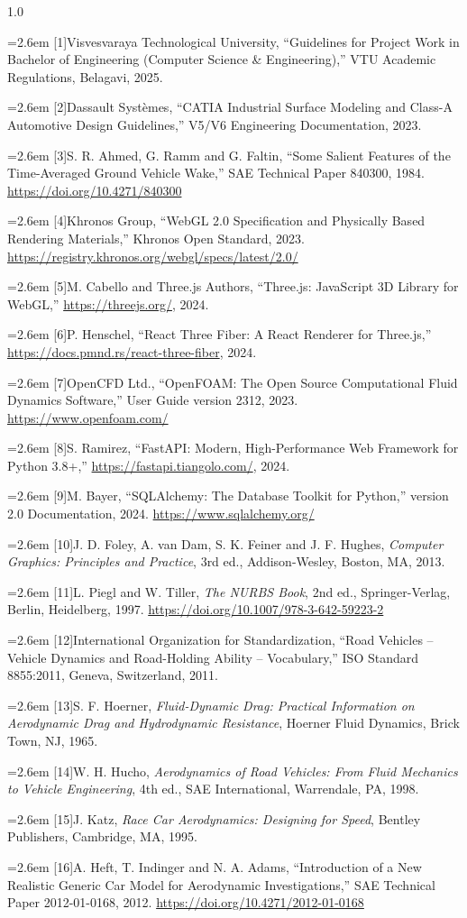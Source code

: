 \documentclass[12pt,a4paper]{report}
\newcommand{\refitem}[2]{\par\noindent\hangindent=2.6em\hangafter=1 [#1]\hspace{0.9em}#2\par\vspace{2pt}}
\begin{document}
\begin{spacing}{1.0}
\small
\refitem{1}{Visvesvaraya Technological University, ``Guidelines for Project Work in Bachelor of Engineering (Computer Science \& Engineering),'' VTU Academic Regulations, Belagavi, 2025.}
\refitem{2}{Dassault Syst{\`e}mes, ``CATIA Industrial Surface Modeling and Class-A Automotive Design Guidelines,'' V5/V6 Engineering Documentation, 2023.}
\refitem{3}{S. R. Ahmed, G. Ramm and G. Faltin, ``Some Salient Features of the Time-Averaged Ground Vehicle Wake,'' SAE Technical Paper 840300, 1984. \url{https://doi.org/10.4271/840300}}
\refitem{4}{Khronos Group, ``WebGL 2.0 Specification and Physically Based Rendering Materials,'' Khronos Open Standard, 2023. \url{https://registry.khronos.org/webgl/specs/latest/2.0/}}
\refitem{5}{M. Cabello and Three.js Authors, ``Three.js: JavaScript 3D Library for WebGL,'' \url{https://threejs.org/}, 2024.}
\refitem{6}{P. Henschel, ``React Three Fiber: A React Renderer for Three.js,'' \url{https://docs.pmnd.rs/react-three-fiber}, 2024.}
\refitem{7}{OpenCFD Ltd., ``OpenFOAM: The Open Source Computational Fluid Dynamics Software,'' User Guide version 2312, 2023. \url{https://www.openfoam.com/}}
\refitem{8}{S. Ramirez, ``FastAPI: Modern, High-Performance Web Framework for Python 3.8+,'' \url{https://fastapi.tiangolo.com/}, 2024.}
\refitem{9}{M. Bayer, ``SQLAlchemy: The Database Toolkit for Python,'' version 2.0 Documentation, 2024. \url{https://www.sqlalchemy.org/}}
\refitem{10}{J. D. Foley, A. van Dam, S. K. Feiner and J. F. Hughes, \textit{Computer Graphics: Principles and Practice}, 3rd ed., Addison-Wesley, Boston, MA, 2013.}
\refitem{11}{L. Piegl and W. Tiller, \textit{The NURBS Book}, 2nd ed., Springer-Verlag, Berlin, Heidelberg, 1997. \url{https://doi.org/10.1007/978-3-642-59223-2}}
\refitem{12}{International Organization for Standardization, ``Road Vehicles -- Vehicle Dynamics and Road-Holding Ability -- Vocabulary,'' ISO Standard 8855:2011, Geneva, Switzerland, 2011.}
\refitem{13}{S. F. Hoerner, \textit{Fluid-Dynamic Drag: Practical Information on Aerodynamic Drag and Hydrodynamic Resistance}, Hoerner Fluid Dynamics, Brick Town, NJ, 1965.}
\refitem{14}{W. H. Hucho, \textit{Aerodynamics of Road Vehicles: From Fluid Mechanics to Vehicle Engineering}, 4th ed., SAE International, Warrendale, PA, 1998.}
\refitem{15}{J. Katz, \textit{Race Car Aerodynamics: Designing for Speed}, Bentley Publishers, Cambridge, MA, 1995.}
\refitem{16}{A. Heft, T. Indinger and N. A. Adams, ``Introduction of a New Realistic Generic Car Model for Aerodynamic Investigations,'' SAE Technical Paper 2012-01-0168, 2012. \url{https://doi.org/10.4271/2012-01-0168}}

\end{spacing}
\end{document}
